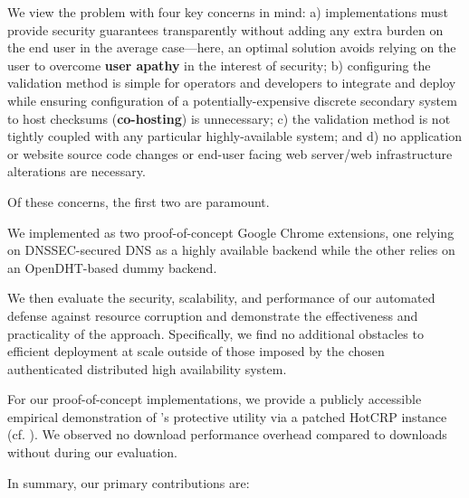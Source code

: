 We view the problem with four key concerns in mind: a) implementations must
provide security guarantees transparently without adding any extra burden on the
end user in the average case---here, an optimal solution avoids relying on the
user to overcome \textbf{user apathy} in the interest of security; b)
configuring the validation method is simple for operators and developers to
integrate and deploy while ensuring configuration of a potentially-expensive
discrete secondary system to host checksums (\ie \textbf{co-hosting}) is
unnecessary; c) the validation method is not tightly coupled with any particular
highly-available system; and d) no application or website source code changes or
end-user facing web server/web infrastructure alterations are necessary.

Of these concerns, the first two are paramount.

We implemented \SYSTEM{} as two proof-of-concept Google Chrome extensions, one
relying on DNSSEC-secured DNS as a highly available backend while the other
relies on an OpenDHT-based dummy backend.

We then evaluate the security, scalability, and performance of our automated
defense against resource corruption and demonstrate the effectiveness and
practicality of the \SYSTEM{} approach. Specifically, we find no additional
obstacles to efficient deployment at scale outside of those imposed by the
chosen authenticated distributed high availability system.

For our proof-of-concept implementations, we provide a publicly accessible
empirical demonstration of \SYSTEM{}'s protective utility via a patched HotCRP
instance (cf. ). We observed no download performance
overhead compared to downloads without \SYSTEM{} during our evaluation.

In summary, our primary contributions are:

